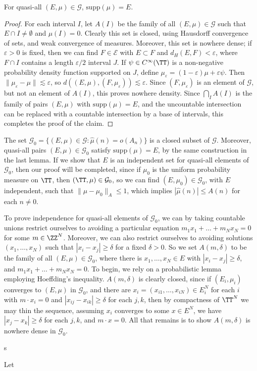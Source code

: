 \begin{lemma}
	For quasi-all $(E,\mu) \in \mathcal{G}$, $\text{supp}(\mu) = E$.
\end{lemma}
\begin{proof}
	For each interval $I$, let $A(I)$ be the family of all $(E,\mu) \in \mathcal{G}$ such that $E \cap I \neq \emptyset$ and $\mu(I) = 0$. Clearly this set is closed, using Hausdorff convergence of sets, and weak convergence of measures. Moreover, this set is nowhere dense; if $\varepsilon > 0$ is fixed, then we can find $F \in \mathcal{E}$ with $E \subset F$ and $d_H(E,F) < \varepsilon$, where $F \cap I$ contains a length $\varepsilon/2$ interval $J$. If $\psi \in C^\infty(\TT)$ is a non-negative probability density function supported on $J$, define $\mu_\varepsilon = (1 - \varepsilon) \mu + \varepsilon \psi$. Then $\| \mu_\varepsilon - \mu \| \lesssim \varepsilon$, so $d((E,\mu), (F,\mu_\varepsilon)) \lesssim \varepsilon$. Since $(F,\mu_\varepsilon)$ is an element of $\mathcal{G}$, but not an element of $A(I)$, this proves nowhere density. Since $\bigcap_I A(I)$ is the family of pairs $(E,\mu)$ with $\text{supp}(\mu) = E$, and the uncountable intersection can be replaced with a countable intersection by a base of intervals, this completes the proof of the claim.
\end{proof}

The set $\mathcal{G}_0 = \{ (E,\mu) \in \mathcal{G}: \widehat{\mu}(n) = o(A_n) \}$ is a closed subset of $\mathcal{G}$. Moreover, quasi-all pairs $(E,\mu) \in \mathcal{G}_0$ satisfy $\text{supp}(\mu) = E$, by the same construction in the last lemma. If we show that $E$ is an independent set for quasi-all elements of $\mathcal{G}_0$, then our proof will be completed, since if $\mu_0$ is the uniform probability measure on $\TT$, then $(\TT,\mu) \in \mathcal{G}_0$, so we can find $(E,\mu_0) \in \mathcal{G}_0$, with $E$ independent, such that $\| \mu - \mu_0 \|_A \leq 1$, which implies $|\widehat{\mu}(n)| \leq A(n)$ for each $n \neq 0$.

To prove independence for quasi-all elements of $\mathcal{G}_0$, we can by taking countable unions restrict ourselves to avoiding a particular equation $m_1 x_1 + \dots + m_N x_N = 0$ for some $m \in \ZZ^N$. Moreover, we can also restrict ourselves to avoiding solutions $(x_1, \dots, x_N)$ such that $|x_i - x_j| \geq \delta$ for a fixed $\delta > 0$. So we set $A(m,\delta)$ to be the family of all $(E,\mu) \in \mathcal{G}_0$, where there is $x_1, \dots, x_N \in E$ with $|x_i - x_j| \geq \delta$, and $m_1 x_1 + \dots + m_N x_N = 0$. To begin, we rely on a probabilistic lemma employing Hoeffding's inequality. $A(m,\delta)$ is clearly closed, since if $(E_i,\mu_i)$ converges to $(E,\mu)$ in $\mathcal{G}_0$, and there are $x_i = (x_{i1}, \dots, x_{iN}) \in E_i^N$ for each $i$ with $m \cdot x_i = 0$ and $|x_{ij} - x_{ik}| \geq \delta$ for each $j,k$, then by compactness of $\TT^N$ we may thin the sequence, assuming $x_i$ converges to some $x \in E^N$, we have $|x_j - x_k| \geq \delta$ for each $j,k$, and $m \cdot x = 0$. All that remains is to show $A(m,\delta)$ is nowhere dense in $\mathcal{G}_0$.

\begin{lemma}
	s
\end{lemma}

\begin{theorem}
	Let 
\end{theorem}




